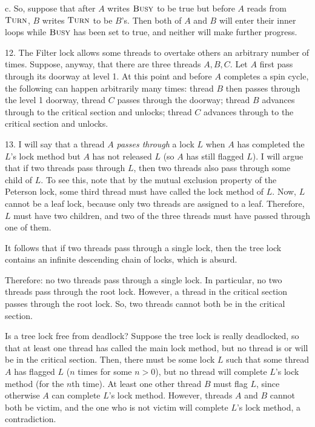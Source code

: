 c. So, suppose that after $A$ writes $\textsc{Busy}$ to be true but before $A$ reads from $\textsc{Turn}$,  $B$ writes $\textsc{Turn}$ to be $B$'s.  Then both of $A$ and $B$ will enter their inner loops while $\textsc{Busy}$ has been set to true, and neither will make further progress.

12. The Filter lock allows some threads to overtake others an arbitrary number of times.  Suppose, anyway, that there are three threads $A, B, C$.  Let $A$ first pass through its doorway at level 1.  At this point and before $A$ completes a spin cycle, the following can happen arbitrarily many times: thread $B$ then passes through the level 1 doorway, thread $C$ passes through the doorway; thread $B$ advances through to the critical section and unlocks; thread $C$ advances through to the critical section and unlocks.

13. I will say that a thread $A$ \emph{passes through} a lock $L$ when $A$ has completed the $L$'s lock method but $A$ has not released $L$ (so $A$ has still flagged $L$).  I will argue that if two threads pass through $L$, then two threads also pass through some child of $L$.  To see this, note that by the mutual exclusion property of the Peterson lock, some third thread must have called the lock method of $L$.  Now, $L$ cannot be a leaf lock, because only two threads are assigned to a leaf.  Therefore, $L$ must have two children, and two of the three threads must have passed through one of them.  

It follows that if two threads pass through a single lock, then the tree lock contains an infinite descending chain of locks, which is absurd.

Therefore: no two threads pass through a single lock.  In particular, no two threads pass through the root lock.  However, a thread in the critical section passes through the root lock.  So, two threads cannot both be in the critical section.

Is a tree lock free from deadlock?  Suppose the tree lock is really deadlocked, so that at least one thread has called the main lock method, but no thread is or will be in the critical section.  Then, there must be some lock $L$ such that some thread $A$ has flagged $L$ ($n$ times for some $n>0$), but no thread will complete $L$'s lock method (for the $n$th time). At least one other thread $B$ must flag $L$, since otherwise $A$ can complete $L$'s lock method.  However, threads $A$ and $B$ cannot both be victim, and the one who is not victim will complete $L$'s lock method, a contradiction.
